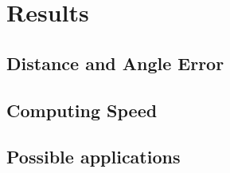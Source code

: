 
\chapter{Results}

\section{Distance and Angle Error}

\section{Computing Speed}

\section{Possible applications}